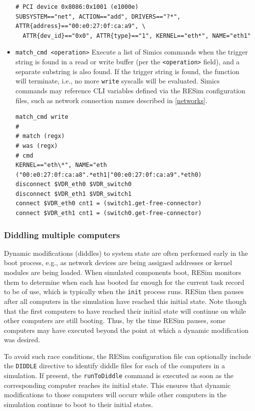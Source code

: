 \documentclass[titlepage]{article}
\begin{document}
\begin{itemize}
\begin{verbatim}
# PCI device 0x8086:0x1001 (e1000e)
SUBSYSTEM=="net", ACTION=="add", DRIVERS=="?*", ATTR{address}=="00:e0:27:0f:ca:a9", \
  ATTR{dev_id}=="0x0", ATTR{type}=="1", KERNEL=="eth*", NAME="eth1"
\end{verbatim}

\item {\tt match\_cmd <operation>} Execute a list of Simics commands when the trigger string is found
in a read or write buffer (per the {\tt <operation>} field), and a separate substring is also found.  If the trigger string is
found, the function will terminate, i.e., no more {\tt write} syscalls will be evaluated.  Simics commands may reference
CLI variables defined via the RESim configuration files, such as network connection names described in \ref{networks}.
\begin{verbatim}
match_cmd write
#
# match (regx)
# was (regx)
# cmd
KERNEL=="eth\*", NAME="eth
("00:e0:27:0f:ca:a8".*eth1|"00:e0:27:0f:ca:a9".*eth0)
disconnect $VDR_eth0 $VDR_switch0
disconnect $VDR_eth1 $VDR_switch1
connect $VDR_eth0 cnt1 = (switch1.get-free-connector)
connect $VDR_eth1 cnt1 = (switch0.get-free-connector)
\end{verbatim}
\end{itemize}

\subsubsection{Diddling multiple computers}
Dynamic modifications (diddles) to system state are often performed early in the boot process, e.g.,
as network devices are being assigned addresses or kernel modules are being loaded.
When simulated components boot, RESim monitors them to determine when each has booted far enough
for the current task record to be of use, which is typically when the {\tt init} process runs.
RESim then pauses after all computers in the simulation have reached this initial state.  Note though that
the first computers to have reached their initial state will continue on while other computers are still
booting.  Thus, by the time RESim pauses, some computers may have executed beyond the point
at which a dynamic modification was desired.

To avoid such race conditions, the RESim configuration file can optionally include the {\tt DIDDLE} directive
to identify diddle files for each of the computers in a simulation.  If present, the {\tt runToDiddle} command is executed
as soon as the corresponding computer reaches its initial state.  This ensures that dynamic modifications
to those computers will occurr while other computers in the simulation continue to boot to their 
initial states.
\end{document}
